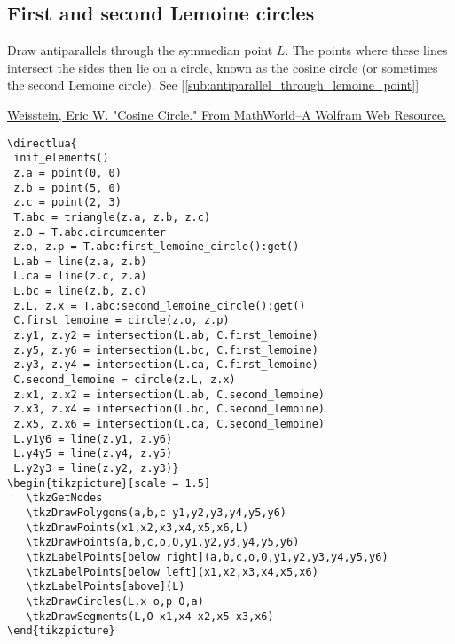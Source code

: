 \subsection{First and second Lemoine circles}
\label{sub:first_and_second_lemoine_circles}

Draw antiparallels through the symmedian point $L$. The points where these lines intersect the sides then lie on a circle, known as the cosine circle (or sometimes the second Lemoine circle). See  [\ref{sub:antiparallel_through_lemoine_point}]
\begin{flushright}
\small
\href{https://mathworld.wolfram.com/CosineCircle.html}{Weisstein, Eric W. "Cosine Circle." From MathWorld--A Wolfram Web Resource.}
\end{flushright}
\small


\begin{verbatim}
\directlua{
 init_elements()
 z.a = point(0, 0)
 z.b = point(5, 0)
 z.c = point(2, 3)
 T.abc = triangle(z.a, z.b, z.c)
 z.O = T.abc.circumcenter
 z.o, z.p = T.abc:first_lemoine_circle():get()
 L.ab = line(z.a, z.b)
 L.ca = line(z.c, z.a)
 L.bc = line(z.b, z.c)
 z.L, z.x = T.abc:second_lemoine_circle():get()
 C.first_lemoine = circle(z.o, z.p)
 z.y1, z.y2 = intersection(L.ab, C.first_lemoine)
 z.y5, z.y6 = intersection(L.bc, C.first_lemoine)
 z.y3, z.y4 = intersection(L.ca, C.first_lemoine)
 C.second_lemoine = circle(z.L, z.x)
 z.x1, z.x2 = intersection(L.ab, C.second_lemoine)
 z.x3, z.x4 = intersection(L.bc, C.second_lemoine)
 z.x5, z.x6 = intersection(L.ca, C.second_lemoine)
 L.y1y6 = line(z.y1, z.y6)
 L.y4y5 = line(z.y4, z.y5)
 L.y2y3 = line(z.y2, z.y3)}
\begin{tikzpicture}[scale = 1.5]
   \tkzGetNodes
   \tkzDrawPolygons(a,b,c y1,y2,y3,y4,y5,y6)
   \tkzDrawPoints(x1,x2,x3,x4,x5,x6,L)
   \tkzDrawPoints(a,b,c,o,O,y1,y2,y3,y4,y5,y6)
   \tkzLabelPoints[below right](a,b,c,o,O,y1,y2,y3,y4,y5,y6)
   \tkzLabelPoints[below left](x1,x2,x3,x4,x5,x6)
   \tkzLabelPoints[above](L)
   \tkzDrawCircles(L,x o,p O,a)
   \tkzDrawSegments(L,O x1,x4 x2,x5 x3,x6)
\end{tikzpicture}
\end{verbatim}

